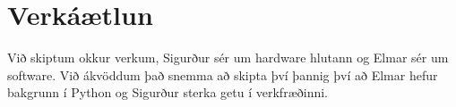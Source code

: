 \section{Verkáætlun}
Við skiptum okkur verkum, Sigurður sér um hardware hlutann og Elmar sér um software. Við ákvöddum það snemma að skipta því þannig því að Elmar hefur bakgrunn í 
Python og Sigurður sterka getu í verkfræðinni.